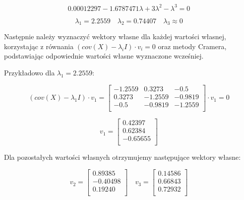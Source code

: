 \documentclass{article}
\begin{document}
\begin{equation*}
    0.00012297 - 1.6787471\lambda+3\lambda^2-\lambda^3 = 0
\end{equation*}

\begin{equation*}
    \lambda_1 = 2.2559 \quad \lambda_2 = 0.74407 \quad \lambda_3 \approx 0
\end{equation*}

Następnie należy wyznaczyć wektory własne dla każdej wartości własnej,
korzystając z równania $(cov(X) - \lambda_i I) \cdot v_i = 0$
oraz metody Cramera, podstawiając
odpowiednie wartości własne wyznaczone wcześniej.

Przykładowo dla $\lambda_1 = 2.2559$:

\begin{equation*}
    (cov(X) - \lambda_1 I) \cdot v_1 = 
    \begin{bmatrix}
        -1.2559 & 0.3273 & -0.5 \\
        0.3273 & -1.2559 & -0.9819 \\
        -0.5 & -0.9819 & -1.2559 \\
    \end{bmatrix} \cdot v_1 = 0
\end{equation*}

\begin{equation*}
    v_1 = 
    \begin{bmatrix}
        0.42397 \\
        0.62384 \\
        -0.65655 \\
    \end{bmatrix}
\end{equation*}

Dla pozostałych wartości własnych otrzymujemy następujące wektory własne:

\begin{equation*}
    v_2 = 
    \begin{bmatrix}
        0.89385 \\
        -0.40498 \\
        0.19240 \\
    \end{bmatrix}
    \quad
    v_3 = 
    \begin{bmatrix}
        0.14586 \\
        0.66843 \\
        0.72932 \\
    \end{bmatrix}
\end{equation*}
\end{document}
